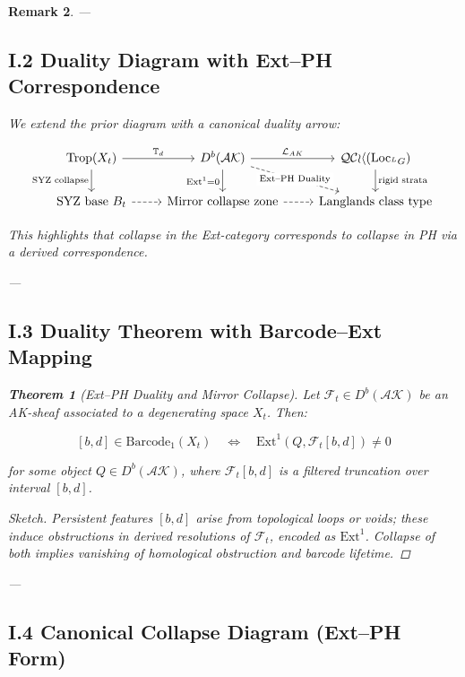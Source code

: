 \documentclass[11pt]{article}
\newtheorem{theorem}{Theorem}[section]
\newtheorem{remark}[theorem]{Remark}
\begin{document}
\begin{remark}
---

\subsection*{I.2 Duality Diagram with Ext–PH Correspondence}

We extend the prior diagram with a canonical duality arrow:

\[
\begin{tikzcd}
\mathrm{Trop}(X_t) \arrow[r, "\mathbb{T}_d"] \arrow[d, "\text{SYZ collapse}"'] &
D^b(\mathcal{AK}) \arrow[r, "\mathcal{L}_{AK}"] \arrow[d, "\mathrm{Ext}^1 = 0"'] \arrow[dr, dashed, "\text{Ext--PH Duality}" description] &
\mathcal{QCoh}(\mathrm{Loc}_{^LG}) \arrow[d, "\text{rigid strata}"] \\
\text{SYZ base } B_t \arrow[r, dashed] &
\text{Mirror collapse zone} \arrow[r, dashed] &
\text{Langlands class type}
\end{tikzcd}
\]

This highlights that collapse in the Ext-category corresponds to collapse in PH via a derived correspondence.

---

\subsection*{I.3 Duality Theorem with Barcode–Ext Mapping}

\begin{theorem}[Ext–PH Duality and Mirror Collapse]
Let \( \mathcal{F}_t \in D^b(\mathcal{AK}) \) be an AK-sheaf associated to a degenerating space \( X_t \). Then:

\[
[b,d] \in \mathrm{Barcode}_1(X_t)
\quad \Longleftrightarrow \quad
\mathrm{Ext}^1(Q, \mathcal{F}_t[b,d]) \neq 0
\]

for some object \( Q \in D^b(\mathcal{AK}) \), where \( \mathcal{F}_t[b,d] \) is a filtered truncation over interval $[b,d]$.
\end{theorem}

\begin{proof}[Sketch]
Persistent features $[b,d]$ arise from topological loops or voids; these induce obstructions in derived resolutions of $\mathcal{F}_t$, encoded as $\mathrm{Ext}^1$. Collapse of both implies vanishing of homological obstruction and barcode lifetime.
\end{proof}

---

\subsection*{I.4 Canonical Collapse Diagram (Ext–PH Form)}


\end{remark}
\end{document}
